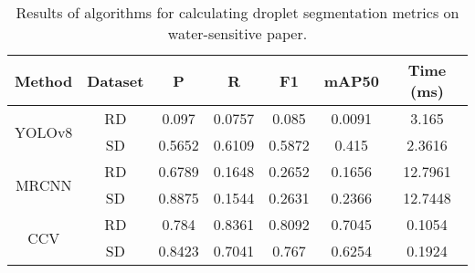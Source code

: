 
\begin{table}[h!]
    \centering
    \caption{Results of algorithms for calculating droplet segmentation metrics on water-sensitive paper.}
    \label{tab:segmentation-metrics-drop}
    \begin{tabular}{ccccccc }
        \hline
        \textbf{Method} & \textbf{Dataset} & \textbf{P} & \textbf{R} & \textbf{F1} & \textbf{mAP50} & \textbf{Time (ms)}\\
        \hline
        \multirow{2}{2cm}[0em]{YOLOv8} & RD & 0.097 & 0.0757 & 0.085 & 0.0091 & 3.165\\
         & SD & 0.5652 & 0.6109 & 0.5872 & 0.415 & 2.3616 \\
        
        \multirow{2}{2cm}[0em]{MRCNN} & RD & 0.6789 & 0.1648 & 0.2652 & 0.1656 & 12.7961\\
         & SD & 0.8875 & 0.1544 & 0.2631 & 0.2366 & 12.7448\\
       
        \multirow{2}{2cm}[0em]{CCV} & RD & 0.784 & 0.8361 & 0.8092 & 0.7045 & 0.1054\\
         & SD & 0.8423 & 0.7041 & 0.767 & 0.6254 & 0.1924\\
        \hline
    \end{tabular}
\end{table}
